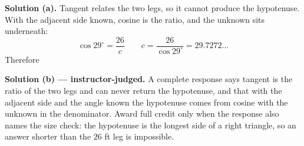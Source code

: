 \documentclass[12pt]{article}
\begin{document}
\noindent\textbf{Solution (a).} Tangent relates the two legs, so it cannot
produce the hypotenuse. With the adjacent side known, cosine is the ratio, and
the unknown sits underneath:
\[ \cos 29^\circ = \frac{26}{c} \qquad c = \frac{26}{\cos 29^\circ} = 29.7272\ldots \]
Therefore 

\noindent\textbf{Solution (b) --- instructor-judged.} A complete response says
tangent is the ratio of the two legs and can never return the hypotenuse, and
that with the adjacent side and the angle known the hypotenuse comes from cosine
with the unknown in the denominator. Award full credit only when the response
also names the size check: the hypotenuse is the longest side of a right
triangle, so an answer shorter than the $26$ ft leg is impossible.
\end{document}
